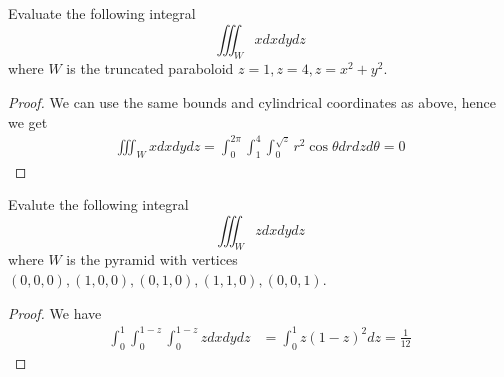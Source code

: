 \documentclass[openany]{book}
\begin{document}
\begin{prob}
    Evaluate the following integral 
    \begin{equation*}
        \iiint_W xdxdydz
    \end{equation*}
    where $W$ is the truncated paraboloid $z=1, z=4, z=x^2+y^2$.
\end{prob}
\begin{proof}
    We can use the same bounds and cylindrical coordinates as above, hence we get 
    \begin{align*}
        \iiint_W xdxdydz=\int_0^{2\pi}\int_1^4\int_0^{\sqrt{z}}r^2\cos\theta drdzd\theta=0
    \end{align*}
\end{proof}





\begin{prob}
    Evalute the following integral 
    \begin{equation*}
        \iiint_W zdxdydz
    \end{equation*}
    where $W$ is the pyramid with vertices $(0,0,0), (1,0,0), (0,1,0), (1,1,0), (0,0,1)$.
\end{prob}
\begin{proof}
    We have 
    \begin{align*}
        \int_0^1\int_{0}^{1-z}\int_0^{1-z}zdxdydz&=\int_0^1z(1-z)^2dz=\frac{1}{12}
    \end{align*}
\end{proof}
\end{document}
